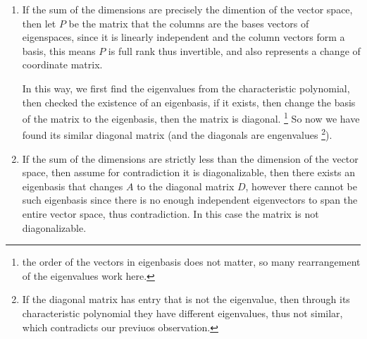 \documentclass[11pt, cyan, night, 1in]{LatexTemplate/hw}
\begin{document}
\begin{enumerate}
    \item If the sum of the dimensions are precisely the dimention of the vector space, then let $P$ be the matrix that the columns are the bases vectors of eigenspaces, since it is linearly independent and the column vectors form a basis, this means $P$ is full rank thus invertible, and also represents a change of coordinate matrix.



    In this way, we first find the eigenvalues from the characteristic polynomial, then checked the existence of an eigenbasis, if it exists, then change the basis of the matrix to the eigenbasis, then the matrix is diagonal. \footnote{the order of the vectors in eigenbasis does not matter, so many rearrangement of the eigenvalues work here.} So now we have found its similar diagonal matrix (and  the diagonals are engenvalues \footnote{If the diagonal matrix has entry that is not the eigenvalue, then through its characteristic polynomial they have different eigenvalues, thus not similar, which contradicts our previuos observation.}).

    \item If the sum of the dimensions are strictly less than the dimension of the vector space, then assume for contradiction it is diagonalizable, then there exists an eigenbasis that changes $A$ to the diagonal matrix $D$, however there cannot be such eigenbasis since there is no enough independent eigenvectors to span the entire vector space, thus contradiction. In this case the matrix is not diagonalizable.
\end{enumerate}
\end{document}
